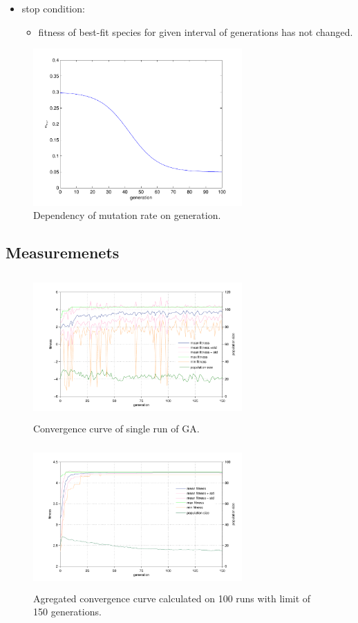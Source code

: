 \documentclass[a4paper,jurnal]{IEEEtran}
\begin{document}
\begin{itemize}
	\item stop condition:
	\begin{itemize}
		\item fitness of best-fit species for given interval of generations has not changed.
	\end{itemize}	
\end{itemize}
\begin{figure}[h]
	\centering
	\includegraphics[width=80mm]{mut_r}
	\caption{Dependency of mutation rate on generation.}
	\label{mut_r}
\end{figure}

\subsection{Measuremenets}

\begin{figure}[h]
	\centering
	\includegraphics[width=80mm,height=55mm]{ga_conv_curve_s}
	\caption{Convergence curve of single run of GA.}
	\label{conv_curve_s}
\end{figure}
\begin{figure}[h]
	\centering
	\includegraphics[width=80mm,height=55mm]{ga_conv_curve}
	\caption{Agregated convergence curve calculated on 100 runs with limit of 150 generations.}
	\label{conv_curve}
\end{figure}
\end{document}
